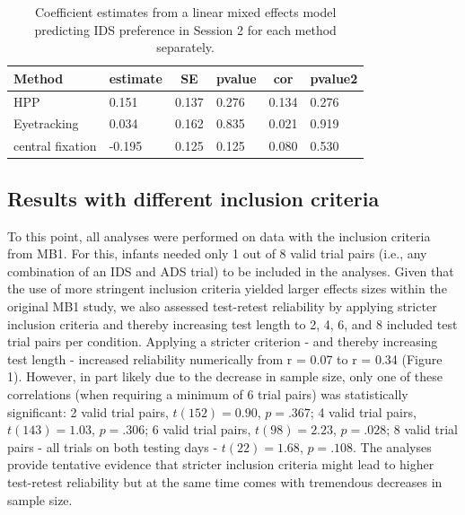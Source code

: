 \documentclass[
  man,floatsintext]{apa6}
\begin{document}
\begin{table}[tbp]

\begin{center}
\begin{threeparttable}

\caption{\label{tab:unnamed-chunk-5}Coefficient estimates from a linear mixed effects model predicting IDS preference in Session 2 for each method separately.}

\begin{tabular}{llllll}
\toprule
Method & \multicolumn{1}{c}{estimate} & \multicolumn{1}{c}{SE} & \multicolumn{1}{c}{pvalue} & \multicolumn{1}{c}{cor} & \multicolumn{1}{c}{pvalue2}\\
\midrule
HPP & 0.151 & 0.137 & 0.276 & 0.134 & 0.276\\
Eyetracking & 0.034 & 0.162 & 0.835 & 0.021 & 0.919\\
central fixation & -0.195 & 0.125 & 0.125 & 0.080 & 0.530\\
\bottomrule
\end{tabular}

\end{threeparttable}
\end{center}

\end{table}

\hypertarget{results-with-different-inclusion-criteria}{%
\subsection{Results with different inclusion criteria}\label{results-with-different-inclusion-criteria}}

To this point, all analyses were performed on data with the inclusion criteria from MB1. For this, infants needed only 1 out of 8 valid trial pairs (i.e., any combination of an IDS and ADS trial) to be included in the analyses. Given that the use of more stringent inclusion criteria yielded larger effects sizes within the original MB1 study, we also assessed test-retest reliability by applying stricter inclusion criteria and thereby increasing test length to 2, 4, 6, and 8 included test trial pairs per condition. Applying a stricter criterion - and thereby increasing test length - increased reliability numerically from r = 0.07 to r = 0.34 (Figure 1). However, in part likely due to the decrease in sample size, only one of these correlations (when requiring a minimum of 6 trial pairs) was statistically significant: 2 valid trial pairs, \(t(152) = 0.90\), \(p = .367\); 4 valid trial pairs, \(t(143) = 1.03\), \(p = .306\); 6 valid trial pairs, \(t(98) = 2.23\), \(p = .028\); 8 valid trial pairs - all trials on both testing days - \(t(22) = 1.68\), \(p = .108\). The analyses provide tentative evidence that stricter inclusion criteria might lead to higher test-retest reliability but at the same time comes with tremendous decreases in sample size.
\end{document}
